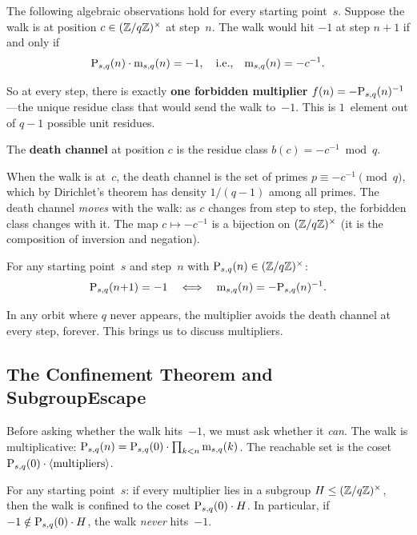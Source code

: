 The following algebraic observations hold for every starting point~$s$.
Suppose the walk is at position $c \in (\mathbb{Z}/q\mathbb{Z})^\times$ at step~$n$.
The walk would hit $-1$ at step $n{+}1$ if and only if
\[
  \mathrm{P}_{s,q}(n) \cdot \mathrm{m}_{s,q}(n) = -1,
  \quad\text{i.e.,}\quad
  \mathrm{m}_{s,q}(n) = -c^{-1}.
\]

\noindent So at every step, there is exactly \textbf{one forbidden multiplier}
$f(n) = -\mathrm{P}_{s,q}(n)^{-1}$---the unique residue class that would
send the walk to~$-1$.  This is $1$~element out of $q-1$ possible
unit residues.

\begin{definition}\label{def:death-channel}
The \textbf{death channel} at position $c$ is the residue class
$b(c) = -c^{-1} \bmod q$.
\end{definition}

\noindent When the walk is at~$c$, the death channel is the set of primes
$p \equiv -c^{-1} \pmod{q}$, which by Dirichlet's theorem has density $1/(q-1)$ among all primes.
The death channel \emph{moves} with the walk: as $c$ changes from step
to step, the forbidden class changes with it.  The map $c \mapsto
-c^{-1}$ is a bijection on $(\mathbb{Z}/q\mathbb{Z})^\times$ (it is the composition
of inversion and negation).

\begin{theorem}\label{thm:forbidden}
For any starting point~$s$ and step~$n$ with $\mathrm{P}_{s,q}(n) \in (\mathbb{Z}/q\mathbb{Z})^\times$:
\[
  \mathrm{P}_{s,q}(n{+}1) = -1
  \quad\Longleftrightarrow\quad
  \mathrm{m}_{s,q}(n) = -\mathrm{P}_{s,q}(n)^{-1}.
\]
\end{theorem}

\noindent In any orbit where $q$ never appears, the multiplier avoids the
death channel at every step, forever.
This brings us to discuss multipliers.

\subsection{The Confinement Theorem and SubgroupEscape}

Before asking whether the walk hits~$-1$, we must ask whether it
\emph{can}.  The walk is multiplicative:
$\mathrm{P}_{s,q}(n) = \mathrm{P}_{s,q}(0) \cdot \prod_{k < n} \mathrm{m}_{s,q}(k)$.
The reachable set is the coset
$\mathrm{P}_{s,q}(0) \cdot \langle \text{multipliers} \rangle$.

\begin{theorem}\label{thm:confinement}
For any starting point~$s$: if every multiplier lies in a subgroup
$H \leq (\mathbb{Z}/q\mathbb{Z})^\times$, then the walk is confined to the coset
$\mathrm{P}_{s,q}(0) \cdot H$.
In particular, if $-1 \notin \mathrm{P}_{s,q}(0) \cdot H$, the walk
\emph{never} hits~$-1$.
\end{theorem}

